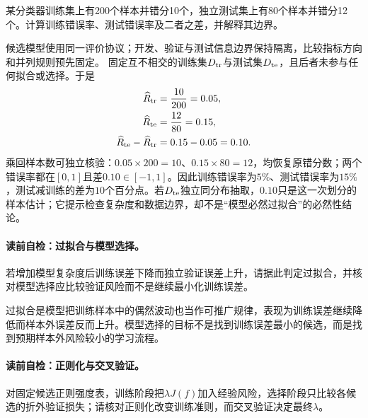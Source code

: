 \label{struct:V1-C10-CH18}
\begin{example}[训练—测试错误率差距]\label{exm:V1-C10-generalization-gap}
某分类器训练集上有200个样本并错分10个，独立测试集上有80个样本并错分12个。计算训练错误率、测试错误率及二者之差，并解释其边界。
\end{example}
\begin{solution}
\SolGiven 候选模型使用同一评价协议；开发、验证与测试信息边界保持隔离，比较指标方向和并列规则预先固定。
\SolDerive
固定互不相交的训练集$D_{\rm tr}$与测试集$D_{\rm te}$，且后者未参与任何拟合或选择。于是
\[
\begin{aligned}
\widehat R_{\rm tr}&=\frac{10}{200}=0.05,\\
\widehat R_{\rm te}&=\frac{12}{80}=0.15,\\
\widehat R_{\rm te}-\widehat R_{\rm tr}&=0.15-0.05=0.10.
\end{aligned}
\]
乘回样本数可独立核验：$0.05\times200=10$、$0.15\times80=12$，均恢复原错分数；两个错误率都在$[0,1]$且差$0.10\in[-1,1]$。因此训练错误率为$5\%$、测试错误率为$15\%$，测试减训练的差为$10$个百分点。若$D_{\rm te}$独立同分布抽取，$0.10$只是这一次划分的样本估计；它提示检查复杂度和数据边界，却不是“模型必然过拟合”的必然性结论。
\end{solution}


\paragraph{读前自检：过拟合与模型选择。}若增加模型复杂度后训练误差下降而独立验证误差上升，请据此判定过拟合，并核对模型选择应比较验证风险而不是继续最小化训练误差。\par

过拟合是模型把训练样本中的偶然波动也当作可推广规律，表现为训练误差继续降低而样本外误差反而上升。模型选择的目标不是找到训练误差最小的候选，而是找到预期样本外风险较小的学习流程。

\paragraph{读前自检：正则化与交叉验证。}对固定候选正则强度表，训练阶段把$\lambda J(f)$加入经验风险，选择阶段只比较各候选的折外验证损失；请核对正则化改变训练准则，而交叉验证决定最终$\lambda$。\par


